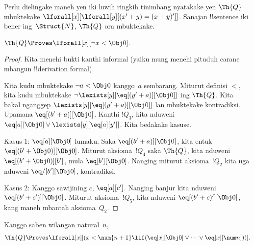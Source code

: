 \documentclass[../../../include/open-logic-section]{subfiles}
\begin{document}
Perlu dielingake maneh yen iki luwih ringkih tinimbang nyatakake yen
$\Th{Q}$ mbuktekake $\lforall[x][\lforall[y][(x' + y) = (x + y)']]$.
Sanajan !!{sentence} iki bener ing~$\Struct{N}$, $\Th{Q}$ ora
mbuktekake.

\begin{lem}
$\Th{Q} \Proves \lforall[x][\lnot x < \Obj 0]$.
\end{lem}

\begin{proof}
Kita menehi bukti kanthi informal (yaiku mung menehi pituduh
carane mbangun !!{derivation} formal).

Kita kudu mbuktekake $\lnot a < \Obj 0$ kanggo~$a$ sembarang. Miturut
definisi $<$, kita kudu mbuktekake $\lnot
\lexists[y][\eq[(y'+a)][\Obj 0]]$ ing $\Th{Q}$. Kita bakal nganggep
$\lexists[y][\eq[(y'+a)][\Obj 0]]$ lan mbuktekake kontradiksi. Upamana
$\eq[(b'+a)][\Obj 0]$. Kanthi $!Q_3$, kita nduweni
$\eq[a][\Obj 0] \lor \lexists[y][\eq[a][y']]$. Kita bedakake
kasuse.

Kasus 1: $\eq[a][\Obj 0]$ lumaku. Saka $\eq[(b'+a)][\Obj 0]$, kita entuk
$\eq[(b' + \Obj 0)][\Obj 0]$. Miturut aksioma~$!Q_4$ saka $\Th{Q}$,
kita nduweni $\eq[(b' + \Obj 0)][b']$, mula $\eq[b'][\Obj 0]$. Nanging
miturut aksioma~$!Q_2$ kita uga nduweni $\eq/[b'][\Obj 0]$,
kontradiksi.

Kasus 2: Kanggo sawijining $c$, $\eq[a][c']$. Nanging banjur kita
nduweni $\eq[(b' + c')][\Obj 0]$. Miturut aksioma~$!Q_5$, kita nduweni
$\eq[(b' + c)'][\Obj 0]$, kang maneh mbantah aksioma~$Q_2$.
\end{proof}

\begin{lem}
Kanggo saben wilangan natural~$n$,
  \[
  \Th{Q} \Proves
  \lforall[x][(x < \num {n+1} \lif (\eq[x][\Obj 0] \lor \dots \lor
    \eq[x][\num n]))].
  \]
\end{lem}
\end{document}
